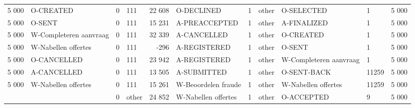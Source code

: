 \begin{tabular}{llllrlllllr}
5 000 & O-CREATED & 0 & 111 & 22 608 & O-DECLINED & 1 & other & O-SELECTED & 1 & 5 000 \\
5 000 & O-SENT & 0 & 111 & 15 231 & A-PREACCEPTED & 1 & other & A-FINALIZED & 1 & 5 000 \\
5 000 & W-Completeren aanvraag & 0 & 111 & 32 339 & A-CANCELLED & 1 & other & O-CREATED & 1 & 5 000 \\
5 000 & W-Nabellen offertes & 0 & 111 & -296 & A-REGISTERED & 1 & other & O-SENT & 1 & 5 000 \\
5 000 & O-CANCELLED & 0 & 111 & 23 942 & A-REGISTERED & 1 & other & W-Completeren aanvraag & 1 & 5 000 \\
5 000 & A-CANCELLED & 0 & 111 & 13 505 & A-SUBMITTED & 1 & other & O-SENT-BACK & 11259 & 5 000 \\
5 000 & W-Nabellen offertes & 0 & 111 & 15 261 & W-Beoordelen fraude & 1 & other & W-Nabellen offertes & 11259 & 5 000 \\
 &  & 0 & other & 24 852 & W-Nabellen offertes & 1 & other & O-ACCEPTED & 9 & 5 000 \\
\bottomrule
\end{tabular}
